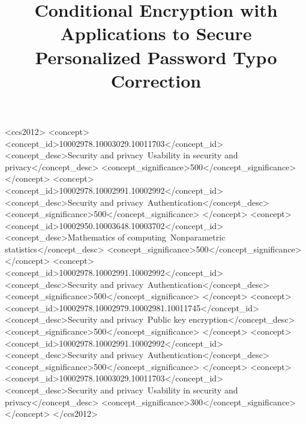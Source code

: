 \documentclass[sigconf,anonymous]{acmart}
\begin{document}
\title{Conditional Encryption with Applications to Secure Personalized Password Typo Correction}






\begin{abstract}

\end{abstract}





\begin{CCSXML}
<ccs2012>
   <concept>
       <concept_id>10002978.10003029.10011703</concept_id>
       <concept_desc>Security and privacy~Usability in security and privacy</concept_desc>
       <concept_significance>500</concept_significance>
       </concept>
   <concept>
       <concept_id>10002978.10002991.10002992</concept_id>
       <concept_desc>Security and privacy~Authentication</concept_desc>
       <concept_significance>500</concept_significance>
       </concept>
   <concept>
       <concept_id>10002950.10003648.10003702</concept_id>
       <concept_desc>Mathematics of computing~Nonparametric statistics</concept_desc>
       <concept_significance>500</concept_significance>
       </concept>
   <concept>
       <concept_id>10002978.10002991.10002992</concept_id>
       <concept_desc>Security and privacy~Authentication</concept_desc>
       <concept_significance>500</concept_significance>
       </concept>
   <concept>
       <concept_id>10002978.10002979.10002981.10011745</concept_id>
       <concept_desc>Security and privacy~Public key encryption</concept_desc>
       <concept_significance>500</concept_significance>
       </concept>
   <concept>
       <concept_id>10002978.10002991.10002992</concept_id>
       <concept_desc>Security and privacy~Authentication</concept_desc>
       <concept_significance>500</concept_significance>
       </concept>
   <concept>
       <concept_id>10002978.10003029.10011703</concept_id>
       <concept_desc>Security and privacy~Usability in security and privacy</concept_desc>
       <concept_significance>300</concept_significance>
       </concept>
 </ccs2012>
\end{CCSXML}
\end{document}
